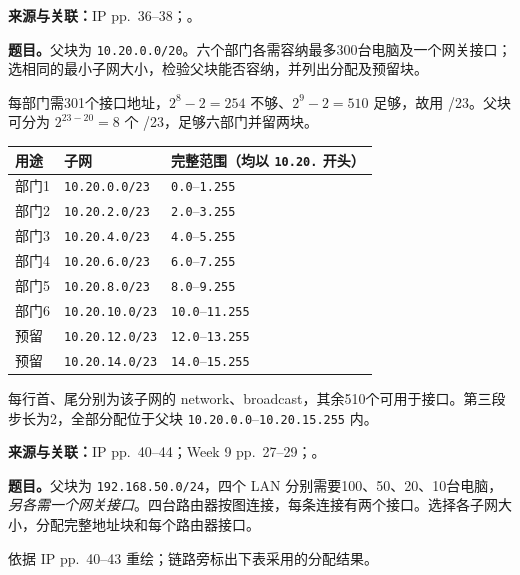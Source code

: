 
\textbf{来源与关联：}IP pp.~36--38；。

\textbf{题目。}父块为 \texttt{10.20.0.0/20}。六个部门各需容纳最多300台电脑及一个网关接口；选相同的最小子网大小，检验父块能否容纳，并列出分配及预留块。

\begin{workedsolution}
每部门需301个接口地址，$2^8-2=254$ 不够、$2^9-2=510$ 足够，故用 /23。父块可分为 $2^{23-20}=8$ 个 /23，足够六部门并留两块。
\begin{center}
\small
\begin{tabular}{@{}lll@{}}
\toprule
用途 & 子网 & 完整范围（均以 \texttt{10.20.} 开头） \\
\midrule
部门1 & \texttt{10.20.0.0/23} & \texttt{0.0}--\texttt{1.255} \\
部门2 & \texttt{10.20.2.0/23} & \texttt{2.0}--\texttt{3.255} \\
部门3 & \texttt{10.20.4.0/23} & \texttt{4.0}--\texttt{5.255} \\
部门4 & \texttt{10.20.6.0/23} & \texttt{6.0}--\texttt{7.255} \\
部门5 & \texttt{10.20.8.0/23} & \texttt{8.0}--\texttt{9.255} \\
部门6 & \texttt{10.20.10.0/23} & \texttt{10.0}--\texttt{11.255} \\
预留 & \texttt{10.20.12.0/23} & \texttt{12.0}--\texttt{13.255} \\
预留 & \texttt{10.20.14.0/23} & \texttt{14.0}--\texttt{15.255} \\
\bottomrule
\end{tabular}
\end{center}
每行首、尾分别为该子网的 network、broadcast，其余510个可用于接口。第三段步长为2，全部分配位于父块 \texttt{10.20.0.0}--\texttt{10.20.15.255} 内。
\end{workedsolution}


\textbf{来源与关联：}IP pp.~40--44；Week 9 pp.~27--29；。

\textbf{题目。}父块为 \texttt{192.168.50.0/24}，四个 LAN 分别需要100、50、20、10台电脑，\emph{另各需一个网关接口}。四台路由器按图连接，每条连接有两个接口。选择各子网大小，分配完整地址块和每个路由器接口。

\begin{center}


\small 依据 IP pp.~40--43 重绘；链路旁标出下表采用的分配结果。
\end{center}

